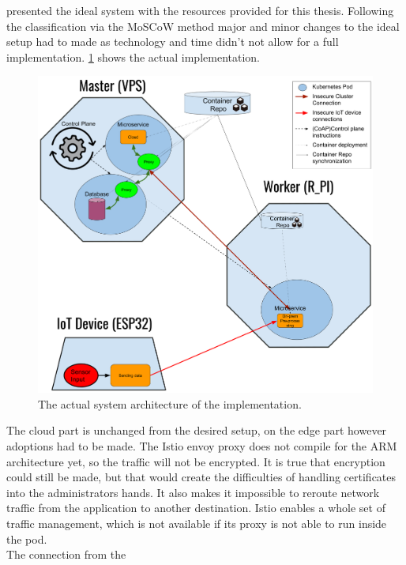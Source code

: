  presented the ideal system with the resources provided for this thesis. Following the classification via the MoSCoW method major and minor changes to the ideal setup had to made as technology and time didn't not allow for a full implementation. \cref{fig:actualImplementationSetup} shows the actual implementation.
\begin{figure}
    \centering
    \includegraphics[width=\textwidth]{figures/actualImplementationSetup.png}
    \caption{The actual system architecture of the implementation.}
    \label{fig:actualImplementationSetup}
\end{figure}
The cloud part is unchanged from the desired setup, on the edge part however adoptions had to be made. The Istio envoy proxy does not compile for the ARM architecture yet, so the traffic will not be encrypted. It is true that encryption could still be made, but that would create the difficulties of handling certificates into the administrators hands. It also makes it impossible to reroute network traffic from the application to another destination. Istio enables a whole set of traffic management, which is not available if its proxy is not able to run inside the pod.\\
The connection from the 